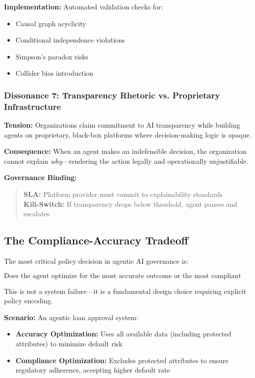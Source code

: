 \documentclass[11pt,a4paper]{article}
\begin{document}
\textbf{Implementation:} Automated validation checks for:
\begin{itemize}
\item Causal graph acyclicity
\item Conditional independence violations
\item Simpson's paradox risks
\item Collider bias introduction
\end{itemize}

\subsubsection{Dissonance 7: Transparency Rhetoric vs. Proprietary Infrastructure}

\textbf{Tension:} Organizations claim commitment to AI transparency while building agents on proprietary, black-box platforms where decision-making logic is opaque.

\textbf{Consequence:} When an agent makes an indefensible decision, the organization cannot explain \textit{why}—rendering the action legally and operationally unjustifiable.

\textbf{Governance Binding:}
\begin{quote}
\textbf{SLA:} Platform provider must commit to explainability standards \\
\textbf{Kill-Switch:} If transparency drops below threshold, agent pauses and escalates
\end{quote}

\subsection{The Compliance-Accuracy Tradeoff}

The most critical policy decision in agentic AI governance is:

\begin{equation}
\boxed{\text{Does the agent optimize for the most accurate outcome or the most compliant one?}}
\end{equation}

This is not a system failure—it is a fundamental design choice requiring explicit policy encoding.

\textbf{Scenario:} An agentic loan approval system:
\begin{itemize}
\item \textbf{Accuracy Optimization:} Uses all available data (including protected attributes) to minimize default risk
\item \textbf{Compliance Optimization:} Excludes protected attributes to ensure regulatory adherence, accepting higher default rate
\end{itemize}
\end{document}

